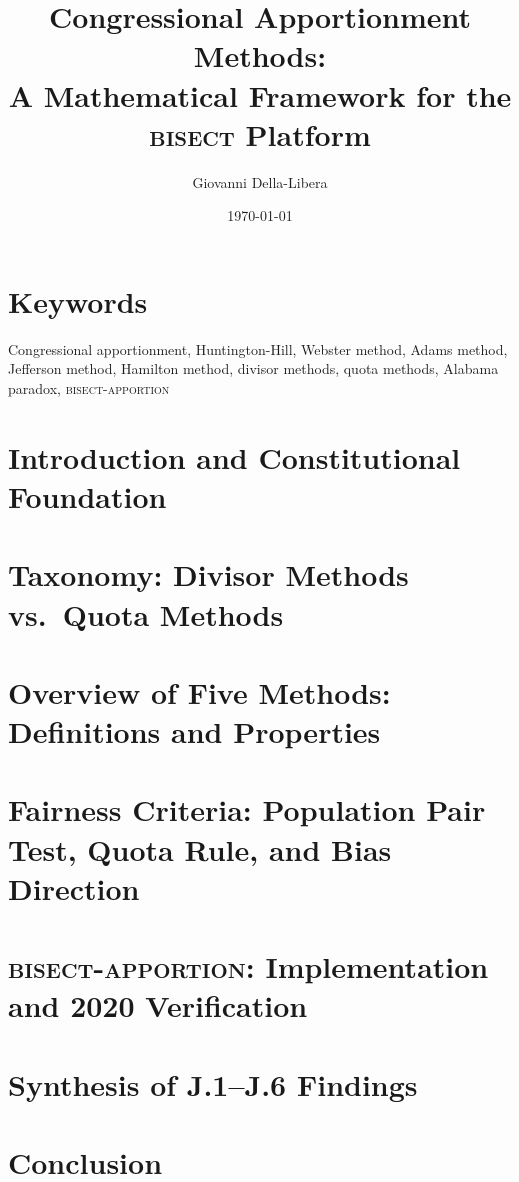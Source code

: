 \documentclass[12pt]{article}
\title{\textbf{Congressional Apportionment Methods:\\
A Mathematical Framework for the \textsc{bisect} Platform}}
\author{Giovanni Della-Libera}
\date{\today}
\begin{document}
\maketitle

\begin{abstract}

\end{abstract}

\section*{Keywords}
Congressional apportionment, Huntington-Hill, Webster method, Adams method,
Jefferson method, Hamilton method, divisor methods, quota methods,
Alabama paradox, \textsc{bisect-apportion}

\section{Introduction and Constitutional Foundation}


\section{Taxonomy: Divisor Methods vs.\ Quota Methods}


\section{Overview of Five Methods: Definitions and Properties}


\section{Fairness Criteria: Population Pair Test, Quota Rule, and Bias Direction}


\section{\textsc{bisect-apportion}: Implementation and 2020 Verification}


\section{Synthesis of J.1--J.6 Findings}


\section{Conclusion}




\end{document}

